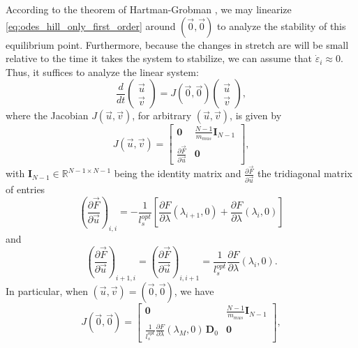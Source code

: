 \documentclass{sfuthesis}
\numberwithin{equation}{section}
\numberwithin{figure}{chapter}
\numberwithin{table}{chapter}
\theoremstyle{definition}
\def\*#1{{\mathbf{#1}}} %
\newcommand{\pder}[2]{\dfrac{\partial #1}{\partial #2}}
\newcommand{\depsilon}{\dot{\varepsilon}}
\newcommand{\R}{\mathbb{R}}
\begin{document}
According to the theorem of Hartman-Grobman \cite{HartmanGrobman}, we may linearize \eqref{eq:odes_hill_only_first_order} around $(\vec{0}, \vec{0})$ to analyze the stability of this equilibrium point. Furthermore, because the changes in stretch are will be small relative to the time it takes the system to stabilize, we can assume that $\depsilon_i \approx 0$. Thus, it suffices to analyze the linear system:
\begin{equation}
    \dfrac{d}{dt} \begin{pmatrix}
        \vec{u} \\ \vec{v} 
    \end{pmatrix} = J(\vec{0}, \vec{0}) \begin{pmatrix}
        \vec{u} \\ \vec{v}
    \end{pmatrix},
\end{equation}
where the Jacobian $J(\vec{u}, \vec{v})$, for arbitrary $(\vec{u},\vec{v})$, is given by
\begin{equation}
    J(\vec{u}, \vec{v}) = \begin{bmatrix}
        \*0 & \frac{N-1}{m_{mus}} \*I_{N-1} \\
        \frac{\partial \vec{F}}{\partial \vec{u}} & \*0
    \end{bmatrix},
\end{equation}
with $\*I_{N-1} \in \R^{N-1 \times N-1}$ being the identity matrix and  $\frac{\partial \vec{F}}{\partial \vec{u}}$ the tridiagonal matrix of entries 
\begin{equation}
    \left( \dfrac{\partial \vec{F}}{\partial \vec{u}} \right)_{i,i} = -\frac{1}{l_s^{opt}} \left[ \pder{F}{\lambda}(\lambda_{i+1},0) + \pder{F}{\lambda}(\lambda_i, 0) \right]
\end{equation}
and
\begin{equation}
    \left( \dfrac{\partial \vec{F}}{\partial \vec{u}} \right)_{i+1,i} = \left( \dfrac{\partial \vec{F}}{\partial \vec{u}} \right)_{i,i+1} = 
    \frac{1}{l_s^{opt}} \pder{F}{\lambda}(\lambda_i,0).
\end{equation}
In particular, when $(\vec{u},\vec{v}) = (\vec{0},\vec{0})$, we have 
\begin{equation}
    J(\vec{0}, \vec{0}) = \left[ \begin{array}{cc}
        \*0 & \frac{N-1}{m_{mus}} \*I_{N-1} \\
        \frac{1}{l_s^{opt}}\frac{\partial F}{\partial \lambda}(\lambda_M,0) \, \*D_0 & \*0
    \end{array} \right],
\end{equation}
\end{document}
